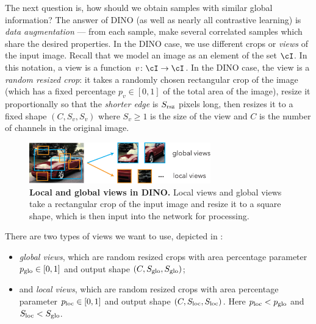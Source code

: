 \documentclass[../../book-main.tex]{subfiles}
\begin{document}
The next question is, how should we obtain samples with similar global information? The answer of DINO (as well as nearly all contrastive learning) is \textit{data augmentation} --- from each sample, make several correlated samples which share the desired properties. In the DINO case, we use different crops or \textit{views} of the input image. Recall that we model an image as an element of the set \(\cI\). In this notation, a view is a function \(v \colon \cI \to \cI\). In the DINO case, the view is a \textit{random resized crop}: it takes a randomly chosen rectangular crop of the image (which has a fixed percentage \(p_{v} \in [0, 1]\) of the total area of the image), resize it proportionally so that the \textit{shorter edge} is \(S_{\mathrm{rsz}}\) pixels long, then resizes it to a fixed shape \((C, S_{v}, S_{v})\) where \(S_{v} \geq 1\) is the size of the view and \(C\) is the number of channels in the original image. 

\begin{figure}
    \centering 
    \includegraphics[width=0.7\textwidth]{figs_chap7/global_local_views.pdf}
    \caption{\textbf{Local and global views in DINO.} Local views and global views take a rectangular crop of the input image and resize it to a square shape, which is then input into the network for processing.}
    \label{fig:dino_local_global_views}
\end{figure}

There are two types of views we want to use, depicted in : 
\begin{itemize}
    \item \textit{global views}, which are random resized crops with area percentage parameter \(p_{\mathrm{glo}} \in [0, 1]\) and output shape \((C, S_{\mathrm{glo}}, S_{\mathrm{glo}})\);
    \item and \textit{local views}, which are random resized crops with area percentage parameter \(p_{\mathrm{loc}} \in [0, 1]\) and output shape \((C, S_{\mathrm{loc}}, S_{\mathrm{loc}})\). Here \(p_{\mathrm{loc}} < p_{\mathrm{glo}}\) and \(S_{\mathrm{loc}} < S_{\mathrm{glo}}\).
\end{itemize}
\end{document}
